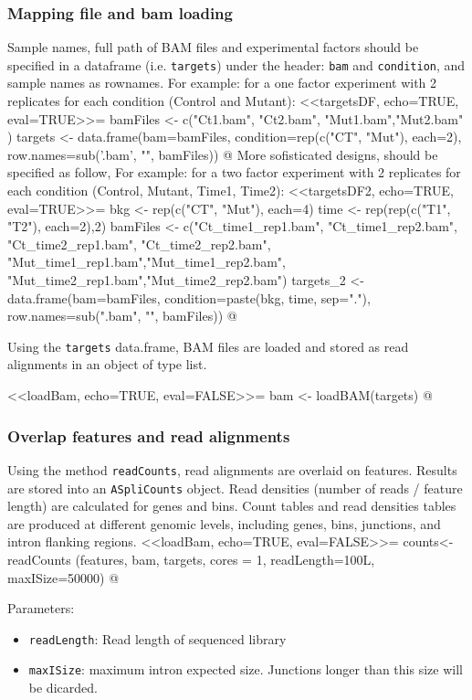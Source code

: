 \documentclass{article}
\begin{document}
\subsubsection{Mapping file and bam loading}%
Sample names, full path of BAM files and experimental factors should be 
specified in a dataframe (i.e. \texttt{targets}) under the header: \texttt{bam} 
and \texttt{condition}, and sample names as rownames. For example: for a one 
factor experiment with 2 replicates for each condition (Control and Mutant):
<<targetsDF, echo=TRUE, eval=TRUE>>=
bamFiles <- c("Ct1.bam", "Ct2.bam", "Mut1.bam","Mut2.bam" )
targets <- data.frame(bam=bamFiles,
                    condition=rep(c("CT", "Mut"), each=2), 
                    row.names=sub('.bam', "", bamFiles))
@ 
More sofisticated designs, should be specified as follow, For example: for a two
factor experiment with 2 replicates for each condition (Control, Mutant, Time1, Time2):
<<targetsDF2, echo=TRUE, eval=TRUE>>=
bkg <- rep(c("CT", "Mut"), each=4)
time <- rep(rep(c("T1", "T2"), each=2),2)
bamFiles <- c("Ct_time1_rep1.bam", "Ct_time1_rep2.bam",
         "Ct_time2_rep1.bam", "Ct_time2_rep2.bam",
         "Mut_time1_rep1.bam","Mut_time1_rep2.bam",
         "Mut_time2_rep1.bam","Mut_time2_rep2.bam")
targets_2 <- data.frame(bam=bamFiles,
                        condition=paste(bkg, time, sep="."),
                        row.names=sub(".bam", "", bamFiles))
@ 

Using the \texttt{targets} data.frame, BAM files are loaded and stored as read alignments in an object of type list.

<<loadBam, echo=TRUE, eval=FALSE>>=
bam <- loadBAM(targets)
@

\subsubsection{Overlap features and read alignments} 

Using the method \texttt{readCounts}, read alignments are overlaid on features. Results are stored into an \texttt{ASpliCounts} object. Read densities (number of reads / feature length) are calculated for genes and bins.
Count tables and read densities tables are produced at different genomic levels, including genes, bins, junctions, and intron flanking regions. 
<<loadBam, echo=TRUE, eval=FALSE>>=
counts<-readCounts (features, bam, targets, cores = 1, readLength=100L, maxISize=50000)
@

Parameters:
\begin{itemize}
\item \texttt{readLength}: Read length of sequenced library 
\item \texttt{maxISize}: maximum intron expected size. Junctions longer than this size will be dicarded\cite{Hong01122006}.
\end{itemize}
\end{document}
